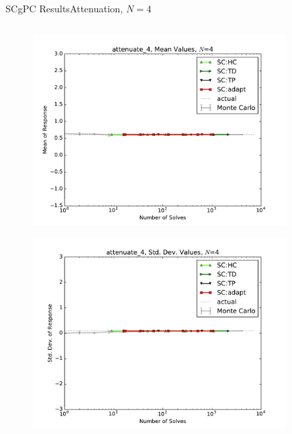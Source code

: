 \documentclass{beamer}
\begin{document}
\begin{frame}{SCgPC Results}{Attenuation, $N=4$}\vspace{-20pt}
 \begin{columns}
   \begin{column}{0.5\textwidth}
        \begin{figure}[h!]
          \centering
          \includegraphics[width=0.8\linewidth]{anlmodels/attenuate_4_mean_vals_nohdmr}
        \end{figure}
        \vspace{-20pt}
        \begin{figure}[h!]
          \centering
          \includegraphics[width=0.8\linewidth]{anlmodels/attenuate_4_var_vals_nohdmr}
        \end{figure}
   \end{column}
   \begin{column}{0.5\textwidth}
        \begin{figure}[h!]
          \centering

\end{figure}
\end{column}
\end{columns}
\end{frame}
\end{document}
